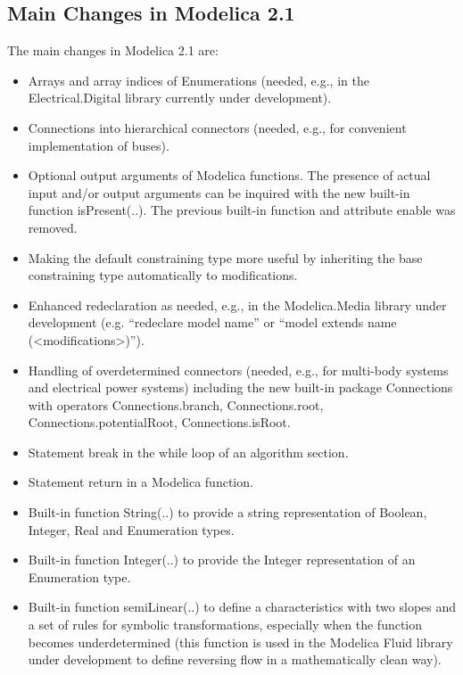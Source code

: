 \documentclass[10pt,a4paper]{report}
\def\doublelabel#1{\label{#1}}
\begin{document}
\subsection{Main Changes in Modelica 2.1}\doublelabel{main-changes-in-modelica-2-1}

The main changes in Modelica 2.1 are:

\begin{itemize}
\item
  Arrays and array indices of Enumerations (needed, e.g., in the
  Electrical.Digital library currently under development).
\item
  Connections into hierarchical connectors (needed, e.g., for convenient
  implementation of buses).
\item
  Optional output arguments of Modelica functions. The presence of
  actual input and/or output arguments can be inquired with the new
  built-in function isPresent(..). The previous built-in function and
  attribute enable was removed.
\item
  Making the default constraining type more useful by inheriting the
  base constraining type automatically to modifications.
\item
  Enhanced redeclaration as needed, e.g., in the Modelica.Media library
  under development (e.g. ``redeclare model name'' or ``model extends
  name (\textless{}modifications\textgreater{})'').
\item
  Handling of overdetermined connectors (needed, e.g., for multi-body
  systems and electrical power systems) including the new built-in
  package Connections with operators Connections.branch,
  Connections.root, Connections.potentialRoot, Connections.isRoot.
\item
  Statement break in the while loop of an algorithm section.
\item
  Statement return in a Modelica function.
\item
  Built-in function String(..) to provide a string representation of
  Boolean, Integer, Real and Enumeration types.
\item
  Built-in function Integer(..) to provide the Integer representation of
  an Enumeration type.
\item
  Built-in function semiLinear(..) to define a characteristics with two
  slopes and a set of rules for symbolic transformations, especially
  when the function becomes underdetermined (this function is used in
  the Modelica Fluid library under development to define reversing flow
  in a mathematically clean way).

\end{itemize}
\end{document}
